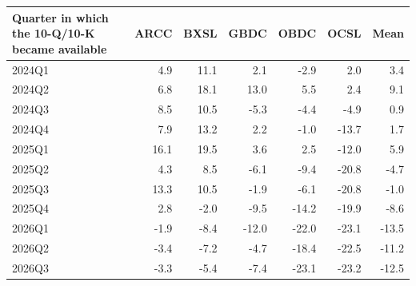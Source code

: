 \documentclass[12pt]{standalone}
\begin{document}
\footnotesize
\begin{tabular}{lrrrrrr}\toprule
Quarter in which the 10-Q/10-K became available & ARCC & BXSL & GBDC & OBDC & OCSL & Mean \\ \midrule
2024Q1 & 4.9 & 11.1 & 2.1 & -2.9 & 2.0 & 3.4 \\
2024Q2 & 6.8 & 18.1 & 13.0 & 5.5 & 2.4 & 9.1 \\
2024Q3 & 8.5 & 10.5 & -5.3 & -4.4 & -4.9 & 0.9 \\
2024Q4 & 7.9 & 13.2 & 2.2 & -1.0 & -13.7 & 1.7 \\
2025Q1 & 16.1 & 19.5 & 3.6 & 2.5 & -12.0 & 5.9 \\
2025Q2 & 4.3 & 8.5 & -6.1 & -9.4 & -20.8 & -4.7 \\
2025Q3 & 13.3 & 10.5 & -1.9 & -6.1 & -20.8 & -1.0 \\
2025Q4 & 2.8 & -2.0 & -9.5 & -14.2 & -19.9 & -8.6 \\
2026Q1 & -1.9 & -8.4 & -12.0 & -22.0 & -23.1 & -13.5 \\
2026Q2 & -3.4 & -7.2 & -4.7 & -18.4 & -22.5 & -11.2 \\
2026Q3 & -3.3 & -5.4 & -7.4 & -23.1 & -23.2 & -12.5 \\
\bottomrule\end{tabular}
\end{document}
